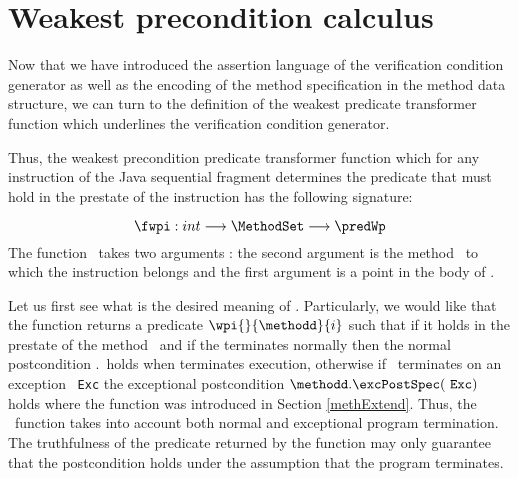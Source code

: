 
 


\section{Weakest precondition calculus} \label{wpRules}


Now that we have introduced the assertion language of the verification condition generator
as well as the encoding of the method specification 
in the method data structure, we can turn to the definition of the weakest predicate transformer function 
which underlines the verification condition generator.
 
Thus, the weakest precondition predicate transformer function which for any instruction of the Java sequential fragment
determines the predicate that must hold in the prestate of the instruction has the following signature:

$$ \fwpi :   int  \longrightarrow   \MethodSet   \longrightarrow \predWp $$
The function \fwpi \ takes two arguments : 
the second argument is the method \methodd \ to which the  instruction belongs
and  the first argument is   a point  in the body of  \methodd.

Let us first see what is the desired meaning of \fwpi. Particularly, we would like that the function \fwpi{}  returns a predicate $\wpi{}{\methodd}{i}$
such that  if it holds in the prestate of the method \methodd \  and if the
\methodd{} terminates normally then the normal postcondition \methodd.\normalPost \ holds when 
\methodd{} terminates execution, otherwise if \methodd \ terminates on an exception
\mbox{ \rm \texttt{Exc}} the exceptional postcondition  $\methodd.\excPostSpec(\mbox{ \rm \texttt{Exc}})$ holds where the function \excPostSpec{} was
introduced in Section \ref{methExtend}. Thus, the \fwpi \ function takes into account both normal and exceptional
program termination. The truthfulness of the predicate returned by the \fwpi{} function
may only guarantee that the postcondition holds under the assumption that the program terminates.
 
